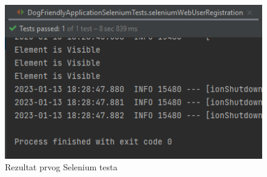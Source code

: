         \begin{figure}[H]
			    \includegraphics[width=\textwidth]{slike/passed-selenium1.png} 
			        \caption{Rezultat prvog Selenium testa}
			    \label{fig:Rezultat prvog Selenium testa}
		\end{figure}

